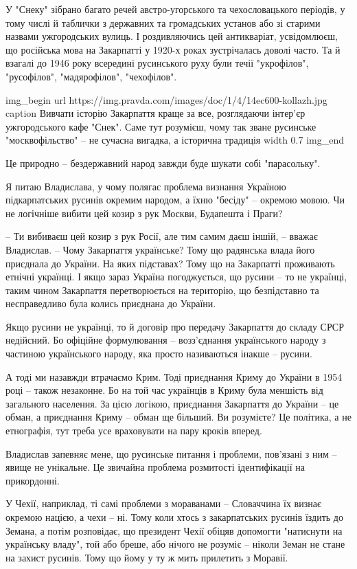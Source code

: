 У "Снеку" зібрано багато речей австро-угорського та чехословацького періодів, у
тому числі й таблички з державних та громадських установ або зі старими назвами
ужгородських вулиць. І роздивляючись цей антикваріат, усвідомлюєш, що російська
мова на Закарпатті у 1920-х роках зустрічалась доволі часто. Та й взагалі до
1946 року всередині русинського руху були течії "укрофілов", "русофілов",
"мадярофілов", "чехофілов".

\ifcmt
img_begin 
        url https://img.pravda.com/images/doc/1/4/14ec600-kollazh.jpg
        caption Вивчати історію Закарпаття краще за все, розглядаючи інтер'єр ужгородського кафе "Снек". Саме тут розумієш, чому так зване русинське "москвофільство" – не сучасна вигадка, а історична традиція
        width 0.7
img_end
\fi

Це природно – бездержавний народ завжди буде шукати собі "парасольку".

Я питаю Владислава, у чому полягає проблема визнання Україною підкарпатських
русинів окремим народом, а їхню "бесіду" – окремою мовою. Чи не логічніше
вибити цей козир з рук Москви, Будапешта і Праги?

– Ти вибиваєш цей козир з рук Росії, але тим самим даєш іншій, – вважає
Владислав. – Чому Закарпаття українське? Тому що радянська влада його приєднала
до України. На яких підставах? Тому що на Закарпатті проживають етнічні
українці. І якщо зараз Україна погоджується, що русини – то не українці, таким
чином Закарпаття перетворюється на територію, що безпідставно та несправедливо
була колись приєднана до України.

Якщо русини не українці, то й договір про передачу Закарпаття до складу СРСР
недійсний. Бо офіційне формулювання – возз'єднання українського народу з
частиною українського народу, яка просто називаються інакше – русини. 

А тоді ми назавжди втрачаємо Крим. Тоді приєднання Криму до України в 1954 році
– також незаконне. Бо на той час українців в Криму була меншість від загального
населення. За цією логікою, приєднання Закарпаття до України – це обман, а
приєднання Криму – обман ще більший. Ви розумієте? Це політика, а не
етнографія, тут треба усе враховувати на пару кроків вперед.

Владислав запевняє мене, що русинське питання і проблеми, пов’язані з ним –
явище не унікальне. Це звичайна проблема розмитості ідентифікації на
прикордонні.

У Чехії, наприклад, ті самі проблеми з мораванами – Словаччина їх визнає
окремою нацією, а чехи – ні. Тому коли хтось з закарпатських русинів їздить до
Земана, а потім розповідає, що президент Чехії обіцяв допомогти "натиснути на
українську владу", той або бреше, або нічого не розуміє – ніколи Земан не стане
на захист русинів. Тому що йому у ту ж мить прилетить з Моравії.

